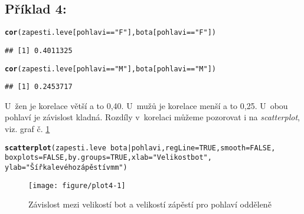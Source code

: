 \documentclass[twoside]{article}\usepackage[]{graphicx}\usepackage[]{color}
\makeatletter
\def\maxwidth{ %
  \ifdim\Gin@nat@width>\linewidth
    \linewidth
  \else
    \Gin@nat@width
  \fi
}
\newcommand{\hlnum}[1]{\textcolor[rgb]{0.686,0.059,0.569}{#1}}%
\newcommand{\hlstr}[1]{\textcolor[rgb]{0.192,0.494,0.8}{#1}}%
\newcommand{\hlopt}[1]{\textcolor[rgb]{0,0,0}{#1}}%
\newcommand{\hlstd}[1]{\textcolor[rgb]{0.345,0.345,0.345}{#1}}%
\newcommand{\hlkwc}[1]{\textcolor[rgb]{0.333,0.667,0.333}{#1}}%
\newcommand{\hlkwd}[1]{\textcolor[rgb]{0.737,0.353,0.396}{\textbf{#1}}}%
\newenvironment{kframe}{%
 \def\at@end@of@kframe{}%
 \ifinner\ifhmode%
  \def\at@end@of@kframe{\end{minipage}}%
  \begin{minipage}{\columnwidth}%
 \fi\fi%
 \def\FrameCommand##1{\hskip\@totalleftmargin \hskip-\fboxsep
 \colorbox{shadecolor}{##1}\hskip-\fboxsep
     \hskip-\linewidth \hskip-\@totalleftmargin \hskip\columnwidth}%
 \MakeFramed {\advance\hsize-\width
   \@totalleftmargin\z@ \linewidth\hsize
   \@setminipage}}%
 {\par\unskip\endMakeFramed%
 \at@end@of@kframe}
\newenvironment{knitrout}{}{} %
\makeatother
\begin{document}
\subsection*{Příklad 4:}
\begin{knitrout}
\color{fgcolor}\begin{kframe}
\begin{alltt}
\hlkwd{cor}\hlstd{(zapesti.leve[pohlavi} \hlopt{==} \hlstr{"F"}\hlstd{], bota[pohlavi} \hlopt{==} \hlstr{"F"}\hlstd{])}
\end{alltt}
\begin{verbatim}
## [1] 0.4011325
\end{verbatim}
\begin{alltt}
\hlkwd{cor}\hlstd{(zapesti.leve[pohlavi} \hlopt{==} \hlstr{"M"}\hlstd{], bota[pohlavi} \hlopt{==} \hlstr{"M"}\hlstd{])}
\end{alltt}
\begin{verbatim}
## [1] 0.2453717
\end{verbatim}
\end{kframe}
\end{knitrout}
U~žen je korelace větší a to 0,40. U~mužů je korelace menší a to 0,25. U~obou pohlaví je závislost kladná. Rozdíly v~korelaci můžeme pozorovat i na \emph{scatterplot}, viz. graf č. \ref{fig:plot4}

\begin{knitrout}
\color{fgcolor}\begin{kframe}
\begin{alltt}
\hlkwd{scatterplot}\hlstd{(zapesti.leve}\hlopt{~}\hlstd{bota} \hlopt{|} \hlstd{pohlavi,} \hlkwc{regLine}\hlstd{=}\hlnum{TRUE}\hlstd{,} \hlkwc{smooth}\hlstd{=}\hlnum{FALSE}\hlstd{,}
    \hlkwc{boxplots}\hlstd{=}\hlnum{FALSE}\hlstd{,} \hlkwc{by.groups}\hlstd{=}\hlnum{TRUE}\hlstd{,} \hlkwc{xlab}\hlstd{=}\hlstr{"Velikost bot"}\hlstd{,}
    \hlkwc{ylab}\hlstd{=}\hlstr{"Šířka levého zápěstí v mm"}\hlstd{)}
\end{alltt}
\end{kframe}\begin{figure}[h]
\texttt{[image: figure/plot4-1]} \caption[Závislost mezi velikostí bot a velikostí zápěstí pro pohlaví odděleně]{Závislost mezi velikostí bot a velikostí zápěstí pro pohlaví odděleně}\label{fig:plot4}
\end{figure}


\end{knitrout}
\end{document}
